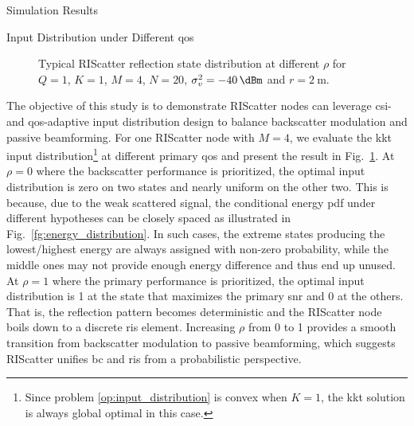 \documentclass[journal]{IEEEtran}
\begin{document}
\begin{section}{Simulation Results}
	\begin{subsection}{Input Distribution under Different \gls{qos}}
		\begin{figure}[!t]
			\centering
			\resizebox{0.65\columnwidth}{!}{
				
			}
			\caption{Typical RIScatter reflection state distribution at different $\rho$ for $Q=1$, $K=1$, $M=4$, $N=20$, $\sigma_v^2=\qty{-40}{\dBm}$ and $r=\qty{2}{\meter}$.}
			\label{fg:distribution_weights}
		\end{figure}
		The objective of this study is to demonstrate RIScatter nodes can leverage \gls{csi}- and \gls{qos}-adaptive input distribution design to balance backscatter modulation and passive beamforming.
		For one RIScatter node with $M=4$, we evaluate the \gls{kkt} input distribution\footnote{Since problem \eqref{op:input_distribution} is convex when $K=1$, the \gls{kkt} solution is always global optimal in this case.} at different primary \gls{qos} and present the result in Fig.~\ref{fg:distribution_weights}.
		At $\rho=0$ where the backscatter performance is prioritized, the optimal input distribution is zero on two states and nearly uniform on the other two.
		This is because, due to the weak scattered signal, the conditional energy \gls{pdf} under different hypotheses can be closely spaced as illustrated in Fig.~\ref{fg:energy_distribution}.
		In such cases, the extreme states producing the lowest/highest energy are always assigned with non-zero probability, while the middle ones may not provide enough energy difference and thus end up unused.
		At $\rho=1$ where the primary performance is prioritized, the optimal input distribution is \num{1} at the state that maximizes the primary \gls{snr} and \num{0} at the others.
		That is, the reflection pattern becomes deterministic and the RIScatter node boils down to a discrete \gls{ris} element.
		Increasing $\rho$ from \num{0} to \num{1} provides a smooth transition from backscatter modulation to passive beamforming, which suggests RIScatter unifies \gls{bc} and \gls{ris} from a probabilistic perspective.
	\end{subsection}


\end{section}
\end{document}
